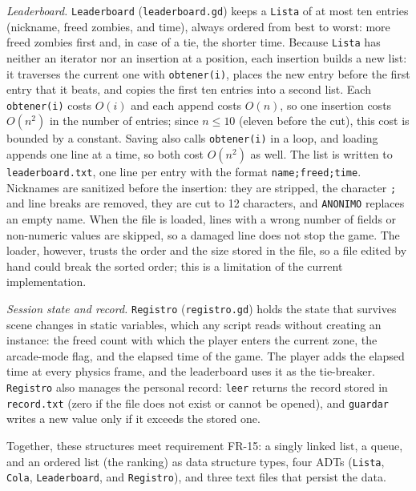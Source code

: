 \documentclass[conference]{IEEEtran}
\begin{document}
\textit{Leaderboard.} \texttt{Leaderboard} (\texttt{leaderboard.gd}) keeps a \texttt{Lista} of at most ten entries (nickname, freed zombies, and time), always ordered from best to worst: more freed zombies first and, in case of a tie, the shorter time. Because \texttt{Lista} has neither an iterator nor an insertion at a position, each insertion builds a new list: it traverses the current one with \texttt{obtener(i)}, places the new entry before the first entry that it beats, and copies the first ten entries into a second list. Each \texttt{obtener(i)} costs $O(i)$ and each append costs $O(n)$, so one insertion costs $O(n^2)$ in the number of entries; since $n \le 10$ (eleven before the cut), this cost is bounded by a constant. Saving also calls \texttt{obtener(i)} in a loop, and loading appends one line at a time, so both cost $O(n^2)$ as well. The list is written to \texttt{leaderboard.txt}, one line per entry with the format \texttt{name;freed;time}. Nicknames are sanitized before the insertion: they are stripped, the character \texttt{;} and line breaks are removed, they are cut to 12 characters, and \texttt{ANONIMO} replaces an empty name. When the file is loaded, lines with a wrong number of fields or non-numeric values are skipped, so a damaged line does not stop the game. The loader, however, trusts the order and the size stored in the file, so a file edited by hand could break the sorted order; this is a limitation of the current implementation.

\textit{Session state and record.} \texttt{Registro} (\texttt{registro.gd}) holds the state that survives scene changes in static variables, which any script reads without creating an instance: the freed count with which the player enters the current zone, the arcade-mode flag, and the elapsed time of the game. The player adds the elapsed time at every physics frame, and the leaderboard uses it as the tie-breaker. \texttt{Registro} also manages the personal record: \texttt{leer} returns the record stored in \texttt{record.txt} (zero if the file does not exist or cannot be opened), and \texttt{guardar} writes a new value only if it exceeds the stored one.

Together, these structures meet requirement FR-15: a singly linked list, a queue, and an ordered list (the ranking) as data structure types, four ADTs (\texttt{Lista}, \texttt{Cola}, \texttt{Leaderboard}, and \texttt{Registro}), and three text files that persist the data.
\end{document}
